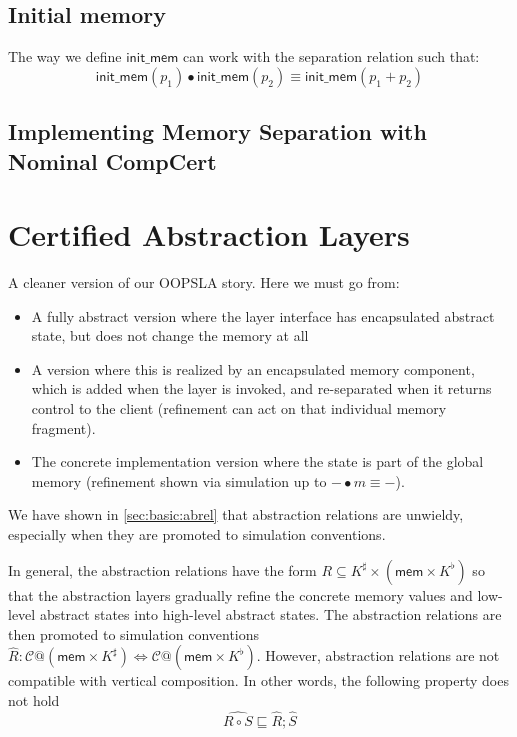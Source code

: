 \documentclass[acmsmall,screen,review,anonymous]{acmart}
\newcommand{\kw}[1]{\ensuremath{ \mathsf{#1} }}
\begin{document}

\subsection{Initial memory} %

The way we define $\kw{init\_mem}$ can work with the
separation relation such that:
\[
  \kw{init\_mem}(p_1) \bullet \kw{init\_mem}(p_2) \equiv
  \kw{init\_mem}(p_1 + p_2)
\]


\subsection{Implementing Memory Separation with Nominal CompCert} %



\section{Certified Abstraction Layers} \label{sec:cal} %

{
\color{gray}
A cleaner version of our OOPSLA story.
Here we must go from:
\begin{itemize}
  \item A fully abstract version where the layer interface
    has encapsulated abstract state,
    but does not change the memory at all
  \item A version where this is realized by an encapsulated
    memory component,
    which is added when the layer is invoked,
    and re-separated when it returns control to the client
    (refinement can act on that individual memory fragment).
  \item The concrete implementation version
    where the state is part of the global memory
    (refinement shown via
    simulation up to ${-} \bullet m \equiv {-}$).
\end{itemize}
}

We have shown in \ref{sec:basic:abrel} that
abstraction relations are unwieldy,
especially when they are promoted to simulation conventions.

In general, the abstraction relations have the form
$R \subseteq K^\sharp \times (\kw{mem} \times K^\flat)$
so that the abstraction layers gradually refine
the concrete memory values and low-level abstract states
into high-level abstract states.
The abstraction relations are then promoted to simulation conventions
$\hat{R}: \mathcal{C}@(\kw{mem}\times K^\sharp)
\Leftrightarrow \mathcal{C}@(\kw{mem}\times K^\flat)$.
However, abstraction relations are not compatible with
vertical composition.
In other words, the following property does not hold
\[
   \hat{R \circ S} \sqsubseteq \hat{R}; \hat{S}
\]
\end{document}
